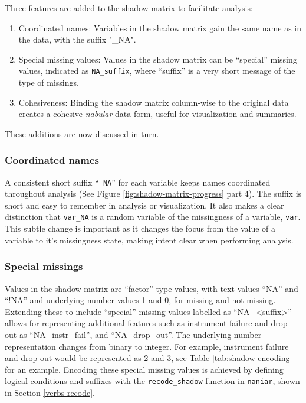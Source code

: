 \documentclass[]{article}
\theoremstyle{definition}
\theoremstyle{definition}
\theoremstyle{definition}
\theoremstyle{remark}
\begin{document}
Three features are added to the shadow matrix to facilitate analysis:

\begin{enumerate}
\def\labelenumi{\arabic{enumi}.}
\item
  Coordinated names: Variables in the shadow matrix gain the same name
  as in the data, with the suffix "\_NA".
\item
  Special missing values: Values in the shadow matrix can be ``special''
  missing values, indicated as \texttt{NA\_suffix}, where ``suffix'' is
  a very short message of the type of missings.
\item
  Cohesiveness: Binding the shadow matrix column-wise to the original
  data creates a cohesive \emph{nabular} data form, useful for
  visualization and summaries.
\end{enumerate}

These additions are now discussed in turn.

\hypertarget{coordinated-names}{%
\subsubsection{Coordinated names}\label{coordinated-names}}

A consistent short suffix ``\texttt{\_NA}'' for each variable keeps
names coordinated throughout analysis (See Figure
\ref{fig:shadow-matrix-progress} part 4). The suffix is short and easy
to remember in analysis or visualization. It also makes a clear
distinction that \texttt{var\_NA} is a random variable of the
missingness of a variable, \texttt{var}. This subtle change is important
as it changes the focus from the value of a variable to it's missingness
state, making intent clear when performing analysis.

\hypertarget{special-missings}{%
\subsubsection{Special missings}\label{special-missings}}

Values in the shadow matrix are ``factor'' type values, with text values
``NA'' and ``!NA'' and underlying number values 1 and 0, for missing and
not missing. Extending these to include ``special'' missing values
labelled as ``NA\_\textless{}suffix\textgreater{}'' allows for
representing additional features such as instrument failure and drop-out
as ``NA\_instr\_fail'', and ``NA\_drop\_out''. The underlying number
representation changes from binary to integer. For example, instrument
failure and drop out would be represented as 2 and 3, see Table
\ref{tab:shadow-encoding} for an example. Encoding these special missing
values is achieved by defining logical conditions and suffixes with the
\texttt{recode\_shadow} function in \texttt{naniar}, shown in Section
\ref{verbs-recode}.
\end{document}
